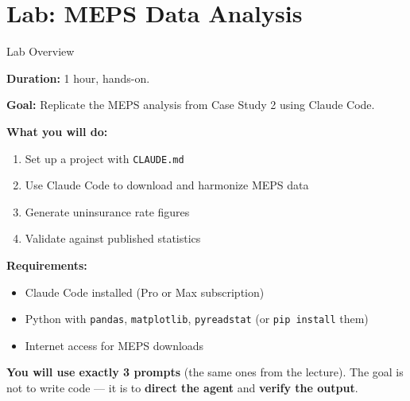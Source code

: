 \documentclass[10pt,english,aspectratio=169]{beamer}
\begin{document}
\section{Lab: MEPS Data Analysis}

\begin{frame}{Lab Overview}

\textbf{Duration:} 1 hour, hands-on.

\vspace{0.2cm}
\textbf{Goal:} Replicate the MEPS analysis from Case Study 2 using Claude Code.

\vspace{0.3cm}
\textbf{What you will do:}
\begin{enumerate}
    \item Set up a project with \texttt{CLAUDE.md}
    \item Use Claude Code to download and harmonize MEPS data
    \item Generate uninsurance rate figures
    \item Validate against published statistics
\end{enumerate}

\vspace{0.3cm}
\textbf{Requirements:}
\begin{itemize}
    \item Claude Code installed (Pro or Max subscription)
    \item Python with \texttt{pandas}, \texttt{matplotlib}, \texttt{pyreadstat} (or \texttt{pip install} them)
    \item Internet access for MEPS downloads
\end{itemize}

\vspace{0.3cm}
\textbf{You will use exactly 3 prompts} (the same ones from the lecture). The goal is not to write code --- it is to \textbf{direct the agent} and \textbf{verify the output}.

\end{frame}
\end{document}
